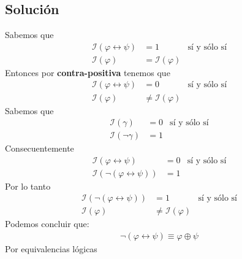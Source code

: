 \documentclass[a4paper]{article}
\begin{document}
\subsection{Solución}
Sabemos que 
\begin{align*}
    \mathcal{I}\left(\varphi \leftrightarrow \psi\right) &= 1 &\text{sí y sólo sí} \\
    \mathcal{I}\left(\varphi\right) &= \mathcal{I}\left(\varphi\right)
\end{align*}
Entonces por \textbf{contra-positiva} tenemos que
\begin{align*}
    \mathcal{I}\left(\varphi \leftrightarrow \psi\right) &= 0 &\text{sí y sólo sí} \\
    \mathcal{I}\left(\varphi\right) &\neq \mathcal{I}\left(\varphi\right)
\end{align*}
Sabemos que 
\begin{align*}
    \mathcal{I}\left(\gamma\right) &= 0 &\text{sí y sólo sí} \\
    \mathcal{I}\left(\neg \gamma\right) &=1 &
\end{align*}
Consecuentemente
\begin{align*}
    \mathcal{I}\left(\varphi \leftrightarrow \psi\right) &= 0 &\text{sí y sólo sí} \\
    \mathcal{I}\left(\neg \left(\varphi \leftrightarrow \psi\right)\right) &= 1
\end{align*}
Por lo tanto
\begin{align*}
    \mathcal{I}\left(\neg \left(\varphi \leftrightarrow \psi\right)\right) &= 1 &\text{sí y sólo sí} \\
    \mathcal{I}\left(\varphi\right) &\neq \mathcal{I}\left(\varphi\right)    
\end{align*}
Podemos concluir que:
\begin{align*}
    \neg \left(\varphi \leftrightarrow \psi\right) \equiv \varphi \oplus \psi
\end{align*}
Por equivalencias lógicas
\end{document}
